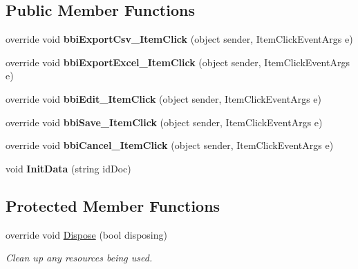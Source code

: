\subsection*{Public Member Functions}
\begin{DoxyCompactItemize}
\item 
\mbox{\label{class_h_k_supply_1_1_forms_1_1_supply_1_1_sales_order_a74af3977b2b6b6634d1d47d12896e123}} 
override void {\bfseries bbi\+Export\+Csv\+\_\+\+Item\+Click} (object sender, Item\+Click\+Event\+Args e)
\item 
\mbox{\label{class_h_k_supply_1_1_forms_1_1_supply_1_1_sales_order_aca5732fac828237b559fb75e84e4578c}} 
override void {\bfseries bbi\+Export\+Excel\+\_\+\+Item\+Click} (object sender, Item\+Click\+Event\+Args e)
\item 
\mbox{\label{class_h_k_supply_1_1_forms_1_1_supply_1_1_sales_order_aa66814e5db7fe85338ab3abe85bf44ba}} 
override void {\bfseries bbi\+Edit\+\_\+\+Item\+Click} (object sender, Item\+Click\+Event\+Args e)
\item 
\mbox{\label{class_h_k_supply_1_1_forms_1_1_supply_1_1_sales_order_ad1f40a0b624c33420e0900d5037bd1d0}} 
override void {\bfseries bbi\+Save\+\_\+\+Item\+Click} (object sender, Item\+Click\+Event\+Args e)
\item 
\mbox{\label{class_h_k_supply_1_1_forms_1_1_supply_1_1_sales_order_a8fd39393346b4b7486bc33d02404c5a4}} 
override void {\bfseries bbi\+Cancel\+\_\+\+Item\+Click} (object sender, Item\+Click\+Event\+Args e)
\item 
\mbox{\label{class_h_k_supply_1_1_forms_1_1_supply_1_1_sales_order_a2fce51f9615bcf10658698596d3ca57f}} 
void {\bfseries Init\+Data} (string id\+Doc)
\end{DoxyCompactItemize}
\subsection*{Protected Member Functions}
\begin{DoxyCompactItemize}
\item 
override void \mbox{\hyperlink{class_h_k_supply_1_1_forms_1_1_supply_1_1_sales_order_a67753c36317bb1b19f4d016da0df068f}{Dispose}} (bool disposing)
\begin{DoxyCompactList}\small\item\em Clean up any resources being used. \end{DoxyCompactList}\end{DoxyCompactItemize}
